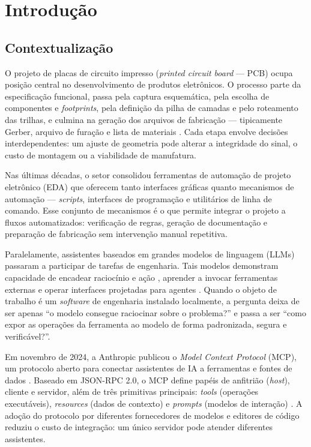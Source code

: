 \chapter{Introdução}\label{cap:introducao}

\section{Contextualização}

O projeto de placas de circuito impresso (\emph{printed circuit board} --- PCB)
ocupa posição central no desenvolvimento de produtos eletrônicos. O processo
parte da especificação funcional, passa pela captura esquemática, pela escolha
de componentes e \emph{footprints}, pela definição da pilha de camadas e pelo
roteamento das trilhas, e culmina na geração dos arquivos de fabricação ---
tipicamente Gerber, arquivo de furação e lista de materiais
\citep{kicaddocs,horowitz2015}. Cada etapa envolve decisões interdependentes:
um ajuste de geometria pode alterar a integridade do sinal, o custo de
montagem ou a viabilidade de manufatura.

Nas últimas décadas, o setor consolidou ferramentas de automação de projeto
eletrônico (EDA) que oferecem tanto interfaces gráficas quanto mecanismos de
automação --- \emph{scripts}, interfaces de programação e utilitários de linha
de comando. Esse conjunto de mecanismos é o que permite integrar o projeto a
fluxos automatizados: verificação de regras, geração de documentação e
preparação de fabricação sem intervenção manual repetitiva.

Paralelamente, assistentes baseados em grandes modelos de linguagem (LLMs)
passaram a participar de tarefas de engenharia. Tais modelos demonstram
capacidade de encadear raciocínio e ação \citep{yao2023react}, aprender a
invocar ferramentas externas \citep{schick2023toolformer} e operar interfaces
projetadas para agentes \citep{yang2024sweagent}. Quando o objeto de trabalho
é um \emph{software} de engenharia instalado localmente, a pergunta deixa de
ser apenas ``o modelo consegue raciocinar sobre o problema?'' e passa a ser
``como expor as operações da ferramenta ao modelo de forma padronizada, segura
e verificável?''.

Em novembro de 2024, a Anthropic publicou o \emph{Model Context Protocol}
(MCP), um protocolo aberto para conectar assistentes de IA a ferramentas e
fontes de dados \citep{anthropic2024mcp}. Baseado em JSON-RPC 2.0, o MCP
define papéis de anfitrião (\emph{host}), cliente e servidor, além de três
primitivas principais: \emph{tools} (operações executáveis), \emph{resources}
(dados de contexto) e \emph{prompts} (modelos de interação)
\citep{mcp2025spec,mcp2025docs}. A adoção do protocolo por diferentes
fornecedores de modelos e editores de código reduziu o custo de integração:
um único servidor pode atender diferentes assistentes.


